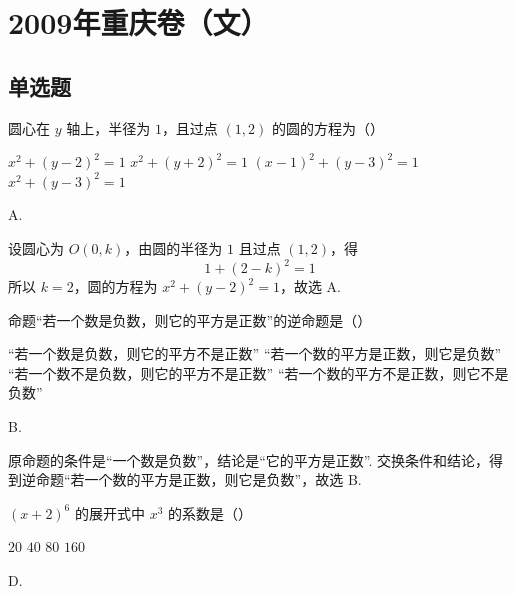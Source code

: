 \chapter{2009年重庆卷（文）}

\section{单选题}

\begin{problem}
圆心在 \(y\) 轴上，半径为 \(1\)，且过点 \((1,2)\) 的圆的方程为（\quad）

\choices
    {\(x^{2} + (y - 2)^{2} = 1\)}
    {\(x^{2} + (y + 2)^{2} = 1\)}
    {\((x - 1)^{2} + (y - 3)^{2} = 1\)}
    {\(x^{2} + (y - 3)^{2} = 1\)}
\end{problem}

\begin{answer}
A.
\end{answer}

\begin{solution}
设圆心为 \(O(0,k)\)，由圆的半径为 \(1\) 且过点 \((1,2)\)，得
\[
1+(2-k)^2=1
\]
所以 \(k=2\)，圆的方程为 \(x^2+(y-2)^2=1\)，故选 A.
\end{solution}

\begin{problem}
命题“若一个数是负数，则它的平方是正数”的逆命题是（\quad）

\choices
    {“若一个数是负数，则它的平方不是正数”}
    {“若一个数的平方是正数，则它是负数”}
    {“若一个数不是负数，则它的平方不是正数”}
    {“若一个数的平方不是正数，则它不是负数”}
\end{problem}

\begin{answer}
B.
\end{answer}

\begin{solution}
原命题的条件是“一个数是负数”，结论是“它的平方是正数”. 交换条件和结论，得到逆命题“若一个数的平方是正数，则它是负数”，故选 B.
\end{solution}

\begin{problem}
\((x + 2)^{6}\) 的展开式中 \(x^{3}\) 的系数是（\quad）

\choices
    {\(20\)}
    {\(40\)}
    {\(80\)}
    {\(160\)}
\end{problem}

\begin{answer}
D.
\end{answer}

